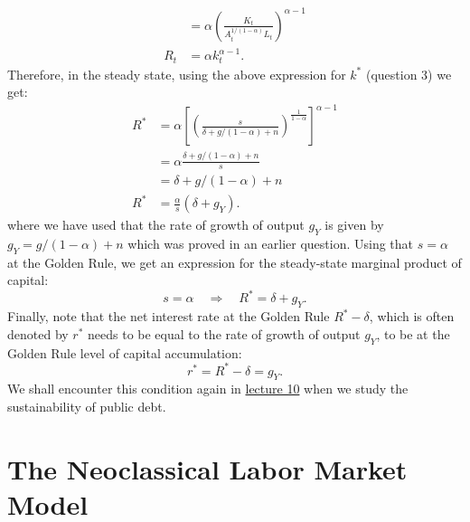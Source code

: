 \documentclass[]{book}
\theoremstyle{definition}
\theoremstyle{definition}
\theoremstyle{definition}
\theoremstyle{remark}
\begin{document}
\begin{enumerate}
\[\begin{aligned}
  &=\alpha \left(\frac{K_t}{A_t^{1/(1-\alpha)} L_t}\right)^{\alpha-1}\\
  R_t&=\alpha k_t^{\alpha-1}.
  \end{aligned}
  \] Therefore, in the steady state, using the above expression for
  \(k^{*}\) (question 3) we get: \[
  \begin{aligned}
  R^{*}&=\alpha \left[\left(\frac{s}{\delta + g/(1-\alpha)+n}\right)^{\frac{1}{1-\alpha}}\right]^{\alpha-1}\\
  &=\alpha \frac{\delta + g/(1-\alpha)+n}{s}\\
  &=\delta + g/(1-\alpha)+n\\
  R^{*}&=\frac{\alpha}{s}\left(\delta + g_Y\right).
  \end{aligned}
  \] where we have used that the rate of growth of output \(g_Y\) is
  given by \(g_Y = g/(1-\alpha)+n\) which was proved in an earlier
  question. Using that \(s=\alpha\) at the Golden Rule, we get an
  expression for the steady-state marginal product of capital:
  \[s= \alpha \quad \Rightarrow \quad \boxed{R^{*} = \delta + g_Y}.\]
  Finally, note that the net interest rate at the Golden Rule
  \(R^{*}-\delta\), which is often denoted by \(r^{*}\) needs to be
  equal to the rate of growth of output \(g_Y\), to be at the Golden
  Rule level of capital accumulation:
  \[\boxed{r^{*}=R^{*}-\delta=g_Y}.\] We shall encounter this condition
  again in \protect\hyperlink{public-debt}{lecture 10} when we study the
  sustainability of public debt.
\end{enumerate}

\section*{The Neoclassical Labor Market
Model}\label{the-neoclassical-labor-market-model-1}
\end{document}
